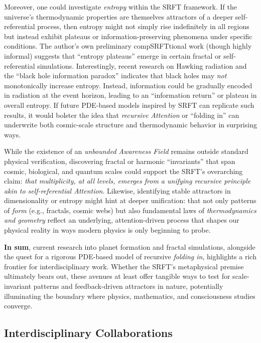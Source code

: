\documentclass[12pt,a4paper]{article}
\begin{document}
Moreover, one could investigate \emph{entropy} within the SRFT framework. If the universe’s thermodynamic properties are themselves attractors of a deeper self-referential process, then entropy might not simply rise indefinitely in all regions but instead exhibit plateaus or information-preserving phenomena under specific conditions. The author’s own preliminary compSRFTtional work (though highly informal) suggests that ``entropy plateaus'' emerge in certain fractal or self-referential simulations. Interestingly, recent research on Hawking radiation and the ``black hole information paradox'' \cite{Page1993, Almheiri2020} indicates that black holes may \emph{not} monotonically increase entropy. Instead, information could be gradually encoded in radiation at the event horizon, leading to an ``information return'' or plateau in overall entropy. If future PDE-based models inspired by SRFT can replicate such results, it would bolster the idea that \emph{recursive Attention} or ``folding in'' can underwrite both cosmic-scale structure and thermodynamic behavior in surprising ways.

While the existence of an \emph{unbounded Awareness Field} remains outside standard physical verification, discovering fractal or harmonic ``invariants'' that span cosmic, biological, and quantum scales could support the SRFT’s overarching claim: \emph{that multiplicity, at all levels, emerges from a unifying recursive principle akin to self-referential Attention}. Likewise, identifying stable attractors in dimensionality or entropy might hint at deeper unification: that not only patterns of \emph{form} (e.g., fractals, cosmic webs) but also fundamental laws of \emph{thermodynamics and geometry} reflect an underlying, attention-driven process that shapes our physical reality in ways modern physics is only beginning to probe.

\bigskip

\smallskip
\noindent
\textbf{In sum}, current research into planet formation and fractal simulations, alongside the quest for a rigorous PDE-based model of recursive \emph{folding in}, highlights a rich frontier for interdisciplinary work. Whether the SRFT’s metaphysical premise ultimately bears out, these avenues at least offer tangible ways to test for scale-invariant patterns and feedback-driven attractors in nature, potentially illuminating the boundary where physics, mathematics, and consciousness studies converge.

\subsection{Interdisciplinary Collaborations}
\label{subsec:collaborations}
\end{document}
